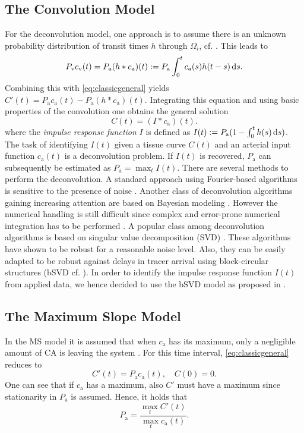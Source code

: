 \documentclass[journal,twocolumn]{IEEEtran}
\newcommand{\ca}{c_\mathrm{a}}
\newcommand{\cout}{c_{\mathrm{v}}}
\newcommand{\Pa}{P_{\mathrm{a}}}
\newcommand{\Pout}{P_{\mathrm{v}}}
\begin{document}
	\subsection{The Convolution Model}\label{sec:conv}
	For the deconvolution model, one approach is to assume there is an unknown probability distribution of transit times $h$ through $\Omega_i$, cf. \cite{sourbron13}. 
	This leads to
	\begin{equation}
		\Pout\cout(t) = \Pa(h\ast\ca)(t) := \Pa\int_0^t \ca(s) h(t-s) \diffint s.
	\end{equation}
	Combining this with \eqref{eq:classicgeneral} yields $C'(t) = \Pa\ca(t)-\Pa (h\ast\ca)(t)$.
	Integrating this equation and using basic properties of the convolution one obtains the general solution
	\begin{equation}
		C(t) = (I\ast\ca)(t).
		\label{eq:conv}
	\end{equation}
	where the \emph{impulse response function} $I$ is defined as $I(t) := \Pa(1-\int_0^t h(s) \diffint s)$.
	The task of identifying $I(t)$ given a tissue curve $C(t)$ and an arterial input function $\ca(t)$ is a deconvolution problem.
	If $I(t)$ is recovered, $\Pa$ can subsequently be estimated as $\Pa = \max_{t} I(t)$.
	There are several methods to perform the deconvolution.
	A standard approach using Fourier-based algorithms is sensitive to the presence of noise \cite{ostergaard96}.
	Another class of deconvolution algorithms gaining increasing attention are based on Bayesian modeling \cite{boutelier12}.
	However the numerical handling is still difficult since complex and error-prone numerical integration has to be performed \cite{boutelier12}.
	A popular class among deconvolution algorithms is based on singular value decomposition (SVD) \cite{ostergaard96}.
	These algorithms have shown to be robust for a reasonable noise level.
	Also, they can be easily adapted to be robust against delays in tracer arrival using block-circular structures (bSVD cf. \cite{wu03}).
	In order to identify the impulse response function $I(t)$ from applied data, we hence decided to use the bSVD model as proposed in \cite{wu03}.
	
	
	
	\subsection{The Maximum Slope Model}\label{sec:ms}	
	In the MS model it is assumed that when $\ca$ has its maximum, only a negligible amount of CA is leaving the system \cite{klotz99}.
	For this time interval, \eqref{eq:classicgeneral} reduces to 
	\begin{equation}
		C'(t) = \Pa\ca(t), \quad C(0) = 0.
	\end{equation}
	One can see that if $\ca$ has a maximum, also $C'$ must have a maximum since stationarity in $\Pa$ is assumed.
	Hence, it holds that
	\begin{equation}\label{eq:MS}
		\Pa = \frac{\max_{t}C'(t)}{\max_{t}\ca(t)}.
	\end{equation}
	
\end{document}
